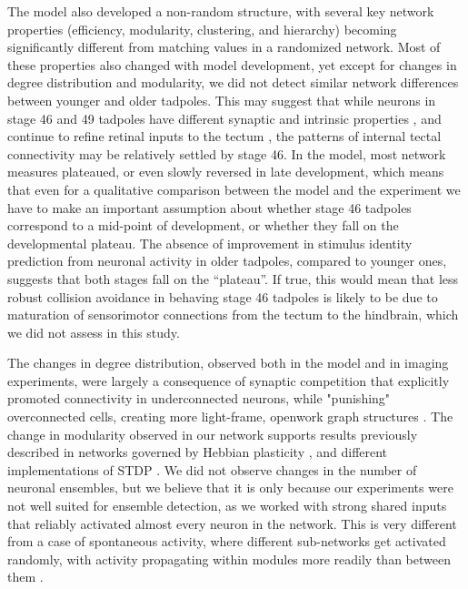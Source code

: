 \documentclass{article}
\begin{document}
The model also developed a non-random structure, with several key network properties (efficiency, modularity, clustering, and hierarchy) becoming significantly different from matching values in a randomized network. Most of these properties also changed with model development, yet except for changes in degree distribution and modularity, we did not detect similar network differences between younger and older tadpoles. This may suggest that while neurons in stage 46 and 49 tadpoles have different synaptic and intrinsic properties \citep{ciarleglio2015}, and continue to refine retinal inputs to the tectum \citep{tao2005refinement,munz2014hebbian}, the patterns of internal tectal connectivity may be relatively settled by stage 46. In the model, most network measures plateaued, or even slowly reversed in late development, which means that even for a qualitative comparison between the model and the experiment we have to make an important assumption about whether stage 46 tadpoles correspond to a mid-point of development, or whether they fall on the developmental plateau. The absence of improvement in stimulus identity prediction from neuronal activity in older tadpoles, compared to younger ones, suggests that both stages fall on the “plateau”. If true, this would mean that less robust collision avoidance in behaving stage 46 tadpoles \citep{dong2009} is likely to be due to maturation of sensorimotor connections from the tectum to the hindbrain, which we did not assess in this study.

The changes in degree distribution, observed both in the model and in imaging experiments, were largely a consequence of synaptic competition that explicitly promoted connectivity in underconnected neurons, while "punishing" overconnected cells, creating more light-frame, openwork graph structures \citep{fiete2010chains}. The change in modularity observed in our network supports results previously described in networks governed by Hebbian plasticity \citep{triplett2018emergence,damicelli2018topomod}, and different implementations of STDP \citep{stam2010modular,litwin2014assemblies}. We did not observe changes in the number of neuronal ensembles, but we believe that it is only because our experiments were not well suited for ensemble detection, as we worked with strong shared inputs that reliably activated almost every neuron in the network. This is very different from a case of spontaneous activity, where different sub-networks get activated randomly, with activity propagating within modules more readily than between them \citep{avitan2017spontaneous,pietri2017emergence}.
\end{document}
